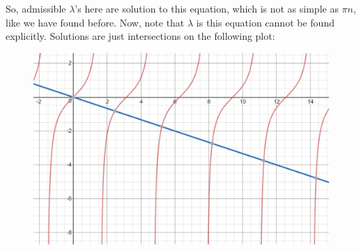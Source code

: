 \documentclass{article}
\theoremstyle{definition}
\begin{document}
So, admissible $\lambda$'s here are solution to this equation, which is not as simple as $\pi n$, like we have found before. Now, note that $\lambda$ is this equation cannot be found explicitly. Solutions are just intersections on the following plot:
\begin{figure}[h!]
	\centering
	\includegraphics[scale=0.6]{tan.png}
\end{figure}
\end{document}
